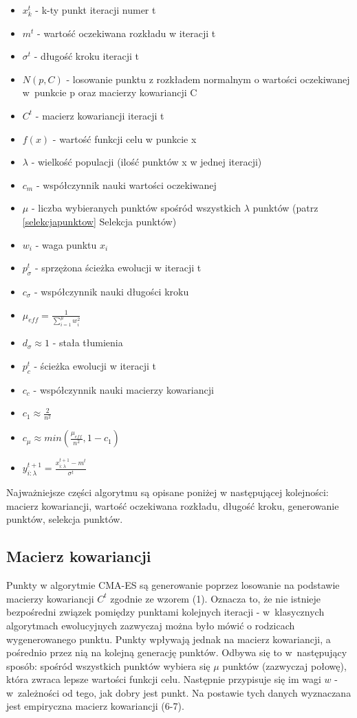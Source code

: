 \documentclass{mini}
\begin{document}
\begin{itemize}[noitemsep]
\item $x_k^t$ - k-ty punkt iteracji numer t
\item $m^t$ - wartość oczekiwana rozkładu w iteracji t
\item $\sigma^t$ - długość kroku iteracji t
\item $N(p,C)$ - losowanie punktu z rozkładem normalnym o wartości oczekiwanej w~punkcie p oraz macierzy kowariancji C
\item $C^t$ - macierz kowariancji iteracji t
\item $f(x)$ - wartość funkcji celu w punkcie x
\item $\lambda$ - wielkość populacji (ilość punktów x w jednej iteracji)
\item $c_m$ - współczynnik nauki wartości oczekiwanej
\item $\mu$ - liczba wybieranych punktów spośród wszystkich $\lambda$ punktów (patrz \ref{selekcjapunktow} Selekcja punktów)
\item $w_i$ - waga punktu $x_i$
\item $p_\sigma^t$ - sprzężona ścieżka ewolucji w iteracji t
\item $c_\sigma$ - współczynnik nauki długości kroku
\item $\mu_{eff}=\frac{1}{\sum\limits_{i=1}^\mu w_i^2}$
\item $d_\sigma \approx 1$ - stała tłumienia
\item $p_c^t$ - ścieżka ewolucji w iteracji t
\item $c_c$ - współczynnik nauki macierzy kowariancji
\item $c_1 \approx \frac{2}{n^2}$
\item $c_\mu \approx min(\frac{\mu_{eff}}{n^2}, 1-c_1)$
\item $y_{i:\lambda}^{t+1} = \frac{x_{i:\lambda}^{t+1}-m^t}{\sigma^t}$
\end{itemize}

Najważniejsze części algorytmu są opisane poniżej w następującej kolejności: macierz kowariancji, wartość oczekiwana rozkładu, długość kroku, generowanie punktów, selekcja punktów.

\subsection{Macierz kowariancji} \label{macierz}
\hspace{3,4ex}Punkty w algorytmie CMA-ES są generowanie poprzez losowanie na podstawie macierzy kowariancji $C^t$ zgodnie ze wzorem (1). Oznacza to, że nie istnieje bezpośredni związek pomiędzy punktami kolejnych iteracji - w~klasycznych algorytmach ewolucyjnych zazwyczaj można było mówić o rodzicach wygenerowanego punktu. Punkty wpływają jednak na macierz kowariancji, a pośrednio przez nią na kolejną generację punktów. Odbywa się to w~następujący sposób: spośród wszystkich punktów wybiera się $\mu$ punktów (zazwyczaj połowę), która zwraca lepsze wartości funkcji celu. Następnie przypisuje się im wagi $w$ - w~zależności od tego, jak dobry jest punkt. Na postawie tych danych wyznaczana jest empiryczna macierz kowariancji (6-7).
\end{document}
